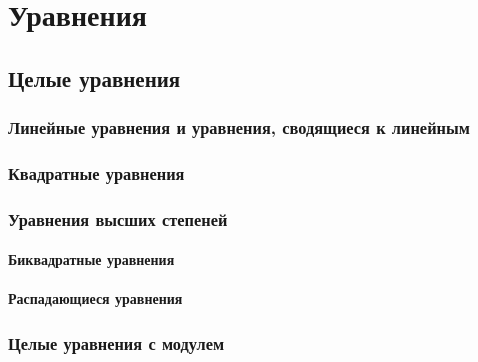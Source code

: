 \chapter{Уравнения}
\section{Целые уравнения}
	\subsection{Линейные уравнения и уравнения, сводящиеся к линейным}
	\subsection{Квадратные уравнения}
	\subsection{Уравнения высших степеней}
		\subsubsection{Биквадратные уравнения}
		\subsubsection{Распадающиеся уравнения}
	\subsection{Целые уравнения с модулем}
